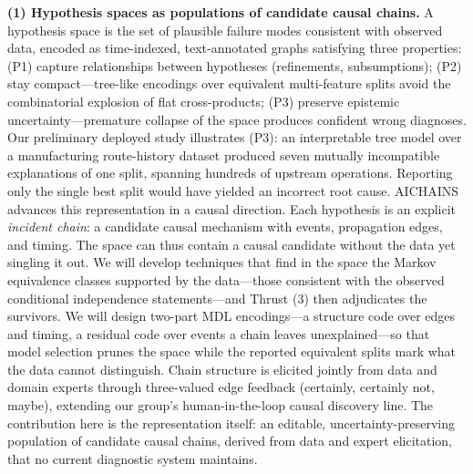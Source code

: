 \documentclass[12pt]{article}
\begin{document}
\textbf{(1) Hypothesis spaces as populations of candidate causal chains.} A hypothesis space is the set of plausible failure modes consistent with observed data, encoded as time-indexed, text-annotated graphs satisfying three properties: (P1) capture relationships between hypotheses (refinements, subsumptions); (P2) stay compact---tree-like encodings over equivalent multi-feature splits avoid the combinatorial explosion of flat cross-products; (P3) preserve epistemic uncertainty---premature collapse of the space produces confident wrong diagnoses. Our preliminary deployed study illustrates (P3): an interpretable tree model over a manufacturing route-history dataset produced seven mutually incompatible explanations of one split, spanning hundreds of upstream operations. Reporting only the single best split would have yielded an incorrect root cause. AICHAINS advances this representation in a causal direction. Each hypothesis is an explicit \emph{incident chain}: a candidate causal mechanism with events, propagation edges, and timing. The space can thus contain a causal candidate without the data yet singling it out. We will develop techniques that find in the space the Markov equivalence classes supported by the data---those consistent with the observed conditional independence statements---and Thrust (3) then adjudicates the survivors. We will design two-part MDL encodings---a structure code over edges and timing, a residual code over events a chain leaves unexplained---so that model selection prunes the space while the reported equivalent splits mark what the data cannot distinguish. Chain structure is elicited jointly from data and domain experts through three-valued edge feedback (certainly, certainly not, maybe), extending our group's human-in-the-loop causal discovery line. The contribution here is the representation itself: an editable, uncertainty-preserving population of candidate causal chains, derived from data and expert elicitation, that no current diagnostic system maintains.
\end{document}
